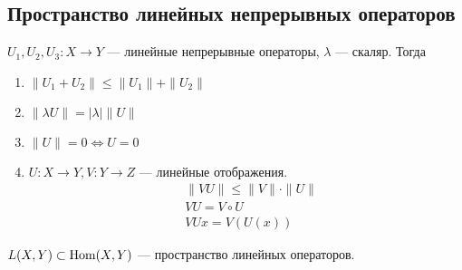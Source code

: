\subsection{Пространство линейных непрерывных операторов}
\begin{thm}
    $ U_1, U_2, U_3 : X \to  Y$ --- линейные непрерывные операторы, $ \lambda $ --- скаляр. 
    Тогда 
    \begin{enumerate}
        \item $\| U_1 + U_2 \| \le \| U_1 \|  + \| U_2 \| $
	    \item $ \| \lambda U \|  = \lvert \lambda \rvert \| U \| $
	   \item $ \| U \| = 0 \Longleftrightarrow U = 0$
	   \item $ U: X \to  Y, V : Y \to Z$ --- линейные отображения.
	       \begin{align*}
		   &\| VU \|  \le \| V \|  \cdot \| U \| \\
		   &V U = V\circ U\\ 
		   &VUx = V(U(x))
	       \end{align*}
    \end{enumerate}
\end{thm}
\begin{name}
    $ L(X, Y) \subset \operatorname{Hom}(X, Y)$ --- пространство линейных операторов.
\end{name}
% 

